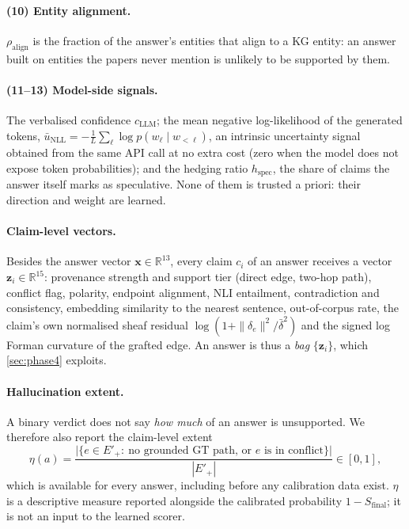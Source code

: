 \documentclass[10pt,twocolumn]{article}
\theoremstyle{remark}
\newcommand{\R}{\mathbb{R}}
\begin{document}
\paragraph{(10) Entity alignment.}
$\rho_{\mathrm{align}}$ is the fraction of the answer's entities that align to a KG entity: an answer built on
entities the papers never mention is unlikely to be supported by them.

\paragraph{(11--13) Model-side signals.}
The verbalised confidence $c_{\mathrm{LLM}}$; the mean negative log-likelihood of the generated tokens,
$\bar u_{\mathrm{NLL}}=-\frac1L\sum_{\ell}\log p(w_\ell\mid w_{<\ell})$, an intrinsic uncertainty
signal~\cite{kadavath2022know,farquhar2024semantic} obtained from the same API call at no extra cost (zero when the
model does not expose token probabilities); and the hedging ratio $h_{\mathrm{spec}}$, the share of claims the answer
itself marks as speculative. None of them is trusted a priori: their direction and weight are learned.

\paragraph{Claim-level vectors.}
Besides the answer vector $\bm x\in\R^{13}$, every claim $c_i$ of an answer receives a vector $\bm z_i\in\R^{15}$:
provenance strength and support tier (direct edge, two-hop path), conflict flag, polarity, endpoint alignment,
NLI entailment, contradiction and consistency, embedding similarity to the nearest sentence, out-of-corpus rate, the
claim's own normalised sheaf residual $\log(1+\|\delta_e\|^2/\bar\delta^2)$ and the signed log Forman curvature of the
grafted edge. An answer is thus a \emph{bag} $\{\bm z_i\}$, which \cref{sec:phase4} exploits.

\paragraph{Hallucination extent.}
A binary verdict does not say \emph{how much} of an answer is unsupported. We therefore also report the claim-level
extent
\begin{equation}
\eta(a)=\frac{\big|\{e\in E'_+:\ \text{no grounded GT path, or } e \text{ is in conflict}\}\big|}{|E'_+|}\in[0,1],
\end{equation}
which is available for every answer, including before any calibration data exist. $\eta$ is a descriptive measure
reported alongside the calibrated probability $1-S_{\mathrm{final}}$; it is not an input to the learned scorer.
\end{document}
